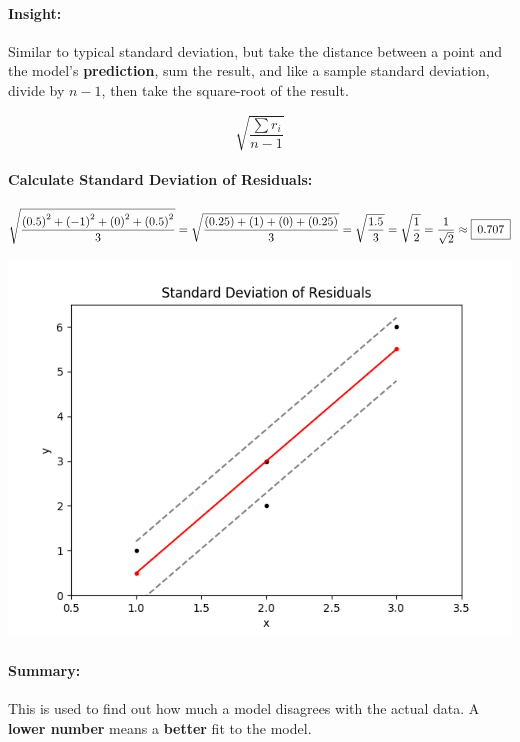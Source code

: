 \documentclass[12pt]{article}
\newcommand{\paddedBox}[1]{{\setlength\fboxsep{5pt}\boxed{#1}}}
\begin{document}
\paragraph{Insight:}
Similar to typical standard deviation, but take the distance between a point and the model's \textbf{prediction}, sum the result, and like a sample standard deviation, divide by $n - 1$, then take the square-root of the result.

\begin{equation}
	\sqrt{\frac{\sum r_{i}}{n -1}}
\end{equation}


\paragraph{Calculate Standard Deviation of Residuals:}
\begin{align*}
	\sqrt{\frac{{(0.5)}^{2} + {(-1)}^{2} + {(0)}^{2} + {(0.5)}^{2}}{3}} =
	\sqrt{\frac{{(0.25)} + {(1)} + {(0)} + {(0.25)}}{3}} =
	\sqrt{\frac{1.5}{3}} =
	\sqrt{\frac{1}{2}} =
	\frac{1}{\sqrt{2}} \approx \paddedBox{0.707}
\end{align*}

\includegraphics[scale=0.99]{standard-deviation-of-residuals}

\paragraph{Summary:}
This is used to find out how much a model disagrees with the actual data. A \textbf{lower number} means a \textbf{better} fit to the model.

\end{document}
